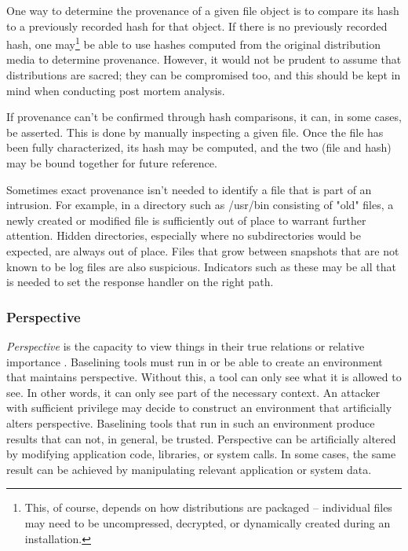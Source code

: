 \documentclass[10pt]{article}
\begin{document}
One way to determine the provenance of a given file object is to
compare its hash to a previously recorded hash for that object.  If
there is no previously recorded hash, one may\footnote{This, of
course, depends on how distributions are packaged -- individual files
may need to be uncompressed, decrypted, or dynamically created during
an installation.} be able to use hashes computed from the original
distribution media to determine provenance.  However, it would not be
prudent to assume that distributions are sacred; they can be
compromised too, and this should be kept in mind when conducting post
mortem analysis.

If provenance can't be confirmed through hash comparisons, it can, in
some cases, be asserted.  This is done by manually inspecting a given
file.  Once the file has been fully characterized, its hash may be
computed, and the two (file and hash) may be bound together for future
reference.

Sometimes exact provenance isn't needed to identify a file that is
part of an intrusion.  For example, in a directory such as /usr/bin
consisting of "old" files, a newly created or modified file is
sufficiently out of place to warrant further attention.  Hidden
directories, especially where no subdirectories would be expected, are
always out of place.  Files that grow between snapshots that are not
known to be log files are also suspicious.  Indicators such as these
may be all that is needed to set the response handler on the right
path.

\subsubsection{Perspective}

{\it Perspective} is the capacity to view things in their true
relations or relative importance \cite{dictionary}.  Baselining tools
must run in or be able to create an environment that maintains
perspective.  Without this, a tool can only see what it is allowed to
see.  In other words, it can only see part of the necessary context.
An attacker with sufficient privilege may decide to construct an
environment that artificially alters perspective.  Baselining tools
that run in such an environment produce results that can not, in
general, be trusted.  Perspective can be artificially altered by
modifying application code, libraries, or system calls.  In some
cases, the same result can be achieved by manipulating relevant
application or system data.
\end{document}
